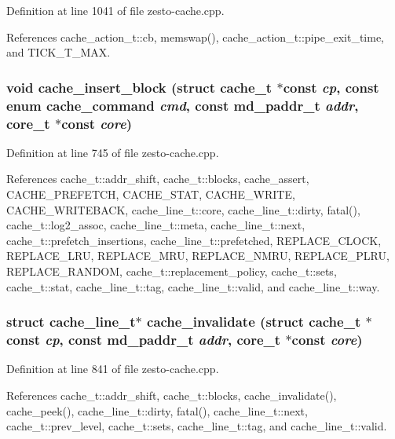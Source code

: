 Definition at line 1041 of file zesto-cache.cpp.

References cache\_\-action\_\-t::cb, memswap(), cache\_\-action\_\-t::pipe\_\-exit\_\-time, and TICK\_\-T\_\-MAX.
\subsubsection[{cache\_\-insert\_\-block}]{\setlength{\rightskip}{0pt plus 5cm}void cache\_\-insert\_\-block (struct {\bf cache\_\-t} $\ast$const  {\em cp}, \/  const enum {\bf cache\_\-command} {\em cmd}, \/  const {\bf md\_\-paddr\_\-t} {\em addr}, \/  {\bf core\_\-t} $\ast$const  {\em core})}\label{zesto-cache_8cpp_1f7522c0547a72f15e199abba2f63812}




Definition at line 745 of file zesto-cache.cpp.

References cache\_\-t::addr\_\-shift, cache\_\-t::blocks, cache\_\-assert, CACHE\_\-PREFETCH, CACHE\_\-STAT, CACHE\_\-WRITE, CACHE\_\-WRITEBACK, cache\_\-line\_\-t::core, cache\_\-line\_\-t::dirty, fatal(), cache\_\-t::log2\_\-assoc, cache\_\-line\_\-t::meta, cache\_\-line\_\-t::next, cache\_\-t::prefetch\_\-insertions, cache\_\-line\_\-t::prefetched, REPLACE\_\-CLOCK, REPLACE\_\-LRU, REPLACE\_\-MRU, REPLACE\_\-NMRU, REPLACE\_\-PLRU, REPLACE\_\-RANDOM, cache\_\-t::replacement\_\-policy, cache\_\-t::sets, cache\_\-t::stat, cache\_\-line\_\-t::tag, cache\_\-line\_\-t::valid, and cache\_\-line\_\-t::way.
\subsubsection[{cache\_\-invalidate}]{\setlength{\rightskip}{0pt plus 5cm}struct {\bf cache\_\-line\_\-t}$\ast$ cache\_\-invalidate (struct {\bf cache\_\-t} $\ast$const  {\em cp}, \/  const {\bf md\_\-paddr\_\-t} {\em addr}, \/  {\bf core\_\-t} $\ast$const  {\em core})\hspace{0.3cm}{\tt  [read]}}\label{zesto-cache_8cpp_3b38a26dd8bf1670d4bf3055d66cfc8d}




Definition at line 841 of file zesto-cache.cpp.

References cache\_\-t::addr\_\-shift, cache\_\-t::blocks, cache\_\-invalidate(), cache\_\-peek(), cache\_\-line\_\-t::dirty, fatal(), cache\_\-line\_\-t::next, cache\_\-t::prev\_\-level, cache\_\-t::sets, cache\_\-line\_\-t::tag, and cache\_\-line\_\-t::valid.

